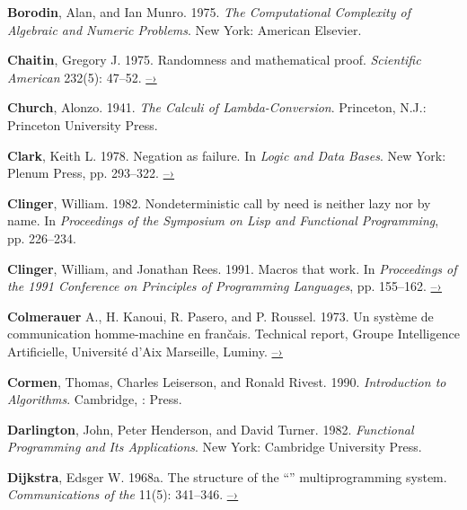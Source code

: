  \label{Borodin and Munro (1975)}
\textbf{Borodin}, Alan, and Ian Munro.  1975.  \textit{The Computational Complexity of
Algebraic and Numeric Problems}. New York: American Elsevier.

 \label{Chaitin 1975}
\textbf{Chaitin}, Gregory J.  1975.  Randomness and mathematical proof.
\textit{Scientific American} 232(5): 47--52.
\href{https://www.cs.auckland.ac.nz/~chaitin/sciamer.html}{–›}

 \label{Church (1941)}
\textbf{Church}, Alonzo.  1941.  \textit{The Calculi of Lambda-Conversion}.  Princeton,
N.J.: Princeton University Press.

 \label{Clark (1978)}
\textbf{Clark}, Keith L.  1978.  Negation as failure.  In \textit{Logic and Data Bases}.
New York: Plenum Press, pp. 293--322.
\href{http://www.doc.ic.ac.uk/~klc/neg.html}{–›}

 \label{Clinger (1982)}
\textbf{Clinger}, William.  1982.  Nondeterministic call by need is neither lazy nor by
name. In \textit{Proceedings of the  Symposium on Lisp and
Functional Programming}, pp. 226--234.

 \label{Clinger and Rees 1991}
\textbf{Clinger}, William, and Jonathan Rees.  1991.  Macros that work.  In
\textit{Proceedings of the 1991  Conference on Principles of
Programming Languages}, pp. 155--162.
\href{http://mumble.net/~jar/pubs/macros_that_work.ps}{–›}

 \label{Colmerauer et al. 1973}
\textbf{Colmerauer} A., H. Kanoui, R. Pasero, and P. Roussel.  1973.  Un système de
communication homme-machine en frančais.  Technical report, Groupe
Intelligence Artificielle, Université d’Aix Marseille, Luminy.
\href{http://alain.colmerauer.free.fr/alcol/ArchivesPublications/HommeMachineFr/HoMa.pdf}{–›}

 \label{Cormen et al. 1990}
\textbf{Cormen}, Thomas, Charles Leiserson, and Ronald Rivest.  1990. \textit{Introduction
to Algorithms}. Cambridge, :  Press.

 \label{Darlington et al. 1982}
\textbf{Darlington}, John, Peter Henderson, and David Turner.  1982.  \textit{Functional
Programming and Its Applications}. New York: Cambridge University Press.

 \label{Dijkstra 1968a}
\textbf{Dijkstra}, Edsger W. 1968a.  The structure of the “”
multiprogramming system.  \textit{Communications of the }
11(5): 341--346.
\href{http://www.cs.utexas.edu/users/EWD/ewd01xx/EWD196.PDF}{–›}

